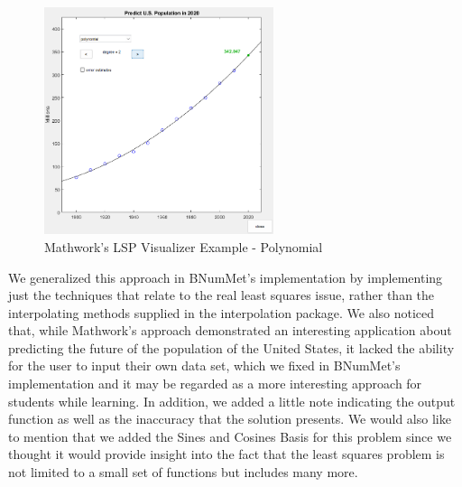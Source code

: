 \begin{figure}[H]
    \centering
    \includegraphics[width=0.6\textwidth]{Include/Images/Thesis/Development/Visualizers/LSP/Mathworks.LSP.Ex1.3.png}
    \caption{Mathwork's LSP Visualizer Example - Polynomial}
    \label{fig:Mathwork's Least Squares Visualizer Example- Polynomial}
\end{figure}

We generalized this approach in BNumMet's implementation by implementing just the techniques that relate to the real least squares issue, rather than the interpolating methods supplied in the interpolation package. We also noticed that, while Mathwork's approach demonstrated an interesting application about predicting the future of the population of the United States, it lacked the ability for the user to input their own data set, which we fixed in BNumMet's implementation and it may be regarded as a more interesting approach for students while learning.  In addition, we added a little note indicating the output function as well as the inaccuracy that the solution presents. We would also like to mention that we added the Sines and Cosines Basis for this problem since we thought it would provide insight into the fact that the least squares problem is not limited to a small set of functions but includes many more.

